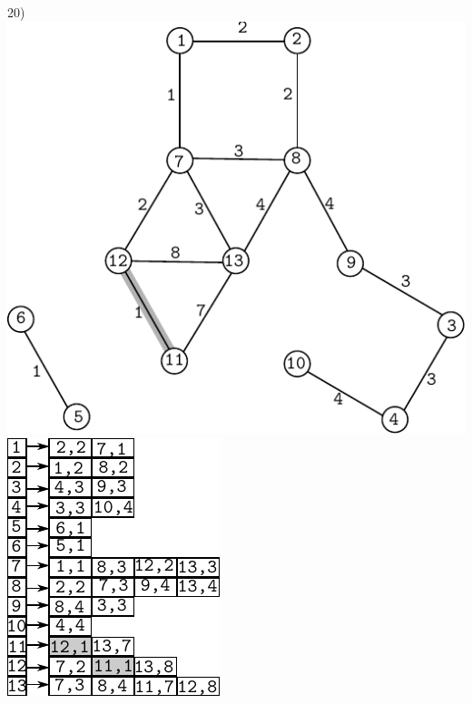 \documentclass{article}
\begin{document}
\begin{center}
20)\includegraphics[scale=0.6]{bottleneck/g20}
\hspace{5mm}
\includegraphics[scale=0.9]{bottleneck/l20}
\end{center}
\end{document}
